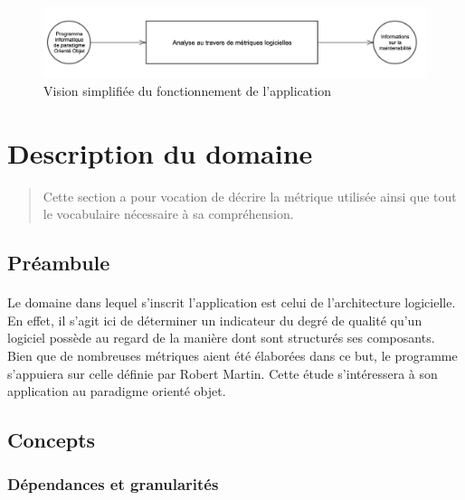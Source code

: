 \documentclass{scrartcl}
\begin{document}
\begin{figure}[ht]
    \centering
    \includegraphics[scale=0.60]{img/intro.png}
    \caption{Vision simplifiée du fonctionnement de l'application} 
    \label{fig:intro}
\end{figure}
    





\newpage
\section{Description du domaine}

    \begin{abstract}
        Cette section a pour vocation de décrire la métrique utilisée ainsi que tout le vocabulaire nécessaire à sa compréhension.
    \end{abstract}

\subsection{Préambule}

    \paragraph{}Le domaine dans lequel s'inscrit l'application est celui de l'architecture logicielle. En effet, il s'agit ici de déterminer un indicateur du degré de qualité qu'un logiciel possède au regard de la manière dont sont structurés ses composants. Bien que de nombreuses métriques aient été élaborées dans ce but, le programme s'appuiera sur celle définie par Robert Martin\cite{Martin:1994}. Cette étude s'intéressera à son application au paradigme orienté objet. 
    
\subsection{Concepts}
\label{mm:concepts}

\subsubsection{Dépendances et granularités}
\end{document}
